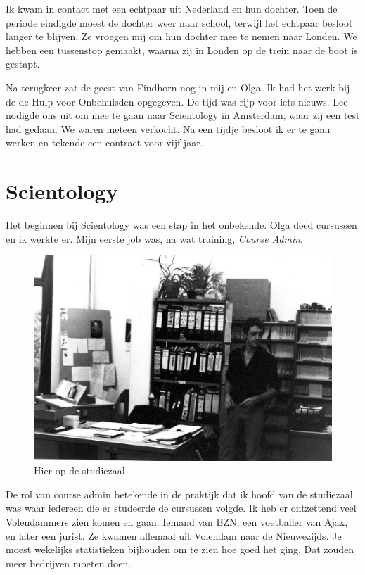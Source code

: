 \documentclass[12pt,twoside, openright]{memoir}
\begin{document}
Ik kwam in contact met een echtpaar uit Nederland en hun dochter. Toen de periode eindigde moest de dochter weer naar school, terwijl het echtpaar besloot langer te blijven. Ze vroegen mij om hun dochter mee te nemen naar Londen. We hebben een tussenstop gemaakt, waarna zij in Londen op de trein naar de boot is gestapt.

Na terugkeer zat de geest van Findhorn nog in mij en Olga. Ik had het werk bij de de Hulp voor Onbehuisden opgegeven. De tijd was rijp voor iets nieuws. Lee nodigde ons uit om mee te gaan naar Scientology in Amsterdam, waar zij een test had gedaan. We waren meteen verkocht. Na een tijdje besloot ik er te gaan werken en tekende een contract voor vijf jaar. 

\section*{Scientology} %
\label{cha:scientologu}

Het beginnen bij Scientology was een stap in het onbekende. Olga deed cursussen en ik werkte er. Mijn eerste job was, na wat training, \emph{Course Admin}. 

\begin{figure}
\centering
\includegraphics[width=\textwidth]{img/ch44/NZVBwal_0006}
\caption*{\footnotesize Hier op de studiezaal}
\end{figure}

De rol van course admin betekende in de praktijk dat ik hoofd van de studiezaal was waar iedereen die er studeerde de cursussen volgde. Ik heb er ontzettend veel Volendammers zien komen en gaan. Iemand van BZN, een voetballer van Ajax, en later een jurist. Ze kwamen allemaal uit Volendam naar de Nieuwezijds. Je moest wekelijks statistieken bijhouden om te zien hoe goed het ging. Dat zouden meer bedrijven moeten doen.
\end{document}
